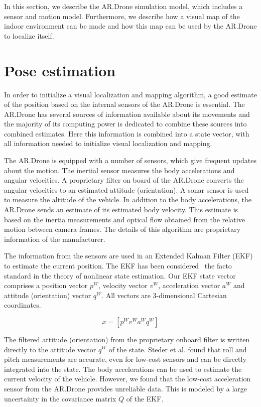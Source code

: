 In this section, we describe the AR.Drone simulation model, which includes a sensor and motion model.
Furthermore, we describe how a visual map of the indoor environment can be made and how this map can be used by the AR.Drone to localize itself.

	\section{Pose estimation}
In order to initialize a visual localization and mapping algorithm, a good estimate of the position based on the internal sensors of the AR.Drone is essential. The AR.Drone has several sources of information available about its movements and the majority of its computing power is dedicated to combine these sources into combined estimates. Here this information is combined into a state vector, with all information needed to initialize visual localization and mapping.

The AR.Drone is equipped with a number of sensors, which give frequent updates about the motion. 
The inertial sensor measures the body accelerations and angular velocities.
A proprietary filter on board of the AR.Drone converts the angular velocities to an estimated attitude (orientation).
A sonar sensor is used to measure the altitude of the vehicle.
In addition to the body accelerations, the AR.Drone sends an estimate of its estimated body velocity.
This estimate is based on the inertia measurements and optical flow obtained from the relative motion between camera frames.
The details of this algorithm are proprietary information of the manufacturer. 

The information from the sensors are used in an Extended Kalman Filter (EKF) to estimate the current position.
The EKF has been considered~\cite{julier2004unscented} the facto standard in the theory of nonlinear state estimation.
Our EKF state vector comprises a position vector $p^{W}$, velocity vector $v^{W}$, acceleration vector $a^{W}$ and attitude (orientation) vector $q^{W}$.
All vectors are 3-dimensional Cartesian coordinates.

\begin{equation}
x = [ p^{W}  v^{W}  a^{W}  q^{W} ]
\label{eq:EKF_state_vecor}
\end{equation}

The filtered attitude (orientation) from the proprietary onboard filter is written directly to the attitude vector $q^{W}$ of the state.
Steder et al. \cite{steder2008visual} found that roll and pitch measurements are accurate, even for low-cost sensors and can be directly integrated into the state.
The body accelerations can be used to estimate the current velocity of the vehicle.
However, we found that the low-cost acceleration sensor from the AR.Drone provides unreliable data.
This is modeled by a large uncertainty in the covariance matrix $Q$ of the EKF.

